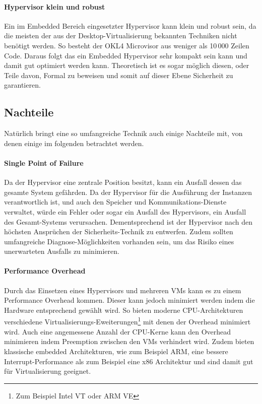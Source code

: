 \documentclass[
  a4paper,					    %
  twoside,
  DIV=calc,     				%
  bibliography=totoc,
  cleardoublepage=empty,
  ngerman,     					%
  final       					%
]{scrbook}
\begin{document}
\paragraph{Hypervisor klein und robust}
Ein im Embedded Bereich eingesetzter Hypervisor kann klein und robust sein, da die meisten der aus der Desktop-Virtualisierung bekannten Techniken nicht benötigt werden. So besteht der OKL4 Microvisor aus weniger als 10\,000 Zeilen Code.\cite{okl4} Daraus folgt das ein Embedded Hypervisor sehr kompakt sein kann und damit gut optimiert werden kann. Theoretisch ist es sogar möglich diesen, oder Teile davon, Formal zu beweisen und somit auf dieser Ebene Sicherheit zu garantieren.

\subsection{Nachteile}
Natürlich bringt eine so umfangreiche Technik auch einige Nachteile mit, von denen einige im folgenden betrachtet werden.

\paragraph{Single Point of Failure}
Da der Hypervisor eine zentrale Position besitzt, kann ein Ausfall dessen das gesamte System gefährden. Da der Hypervisor für die Ausführung der Instanzen verantwortlich ist, und auch den Speicher und Kommunikations-Dienste verwaltet, würde ein Fehler oder sogar ein Ausfall des Hypervisors, ein Ausfall des Gesamt-Systems verursachen. Dementsprechend ist der Hypervisor nach den höchsten Ansprüchen der Sicherheits-Technik zu entwerfen. Zudem sollten umfangreiche Diagnose-Möglichkeiten vorhanden sein, um das Risiko eines unerwarteten Ausfalls zu minimieren.

\paragraph{Performance Overhead}
Durch das Einsetzen eines Hypervisors und mehreren VMs kann es zu einem Performance Overhead kommen. Dieser kann jedoch minimiert werden indem die Hardware entsprechend gewählt wird. So bieten moderne CPU-Architekturen verschiedene Virtualisierungs-Eweiterungen\footnote{Zum Beispiel Intel VT oder ARM VE} mit denen der Overhead minimiert wird. Auch eine angemessene Anzahl der CPU-Kerne kann den Overhead minimieren indem Preemption zwischen den VMs verhindert wird. Zudem bieten klassische embedded Architekturen, wie zum Beispiel ARM, eine bessere Interrupt-Performance als zum Beispiel eine x86 Architektur und sind damit gut für Virtualisierung geeignet.\cite{okl4}
\end{document}
